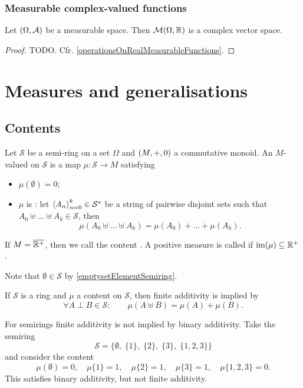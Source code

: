 \subsubsection{Measurable complex-valued functions}
\begin{proposition}
Let $\left( \Omega,\mathcal{A} \right)$ be a measurable space. Then $\operatorname{\mathcal{M}}(\Omega, \mathbb{R})$ is a complex vector space.
\end{proposition}
\begin{proof}
TODO. Cfr. \ref{operationsOnRealMeasurableFunctions}.
\end{proof}


\section{Measures and generalisations}
\subsection{Contents}
\begin{definition}
Let $\mathcal{S}$ be a semi-ring on a set $\Omega$ and $\left( M,+,0 \right)$ a commutative monoid. An $M$-valued  on $\mathcal{S}$ is a map $\mu: \mathcal{S} \to M$ satisfying
\begin{itemize}
\item $\mu(\emptyset) = 0$;
\item $\mu$ is : let $\left\langle A_n \right\rangle_{n=0}^k\in \mathcal{S}^*$ be a string of pairwise disjoint sets such that $A_0 \uplus \ldots \uplus A_{k} \in \mathcal{S}$, then
\[ \mu(A_0 \uplus \ldots \uplus A_{k}) = \mu(A_0) + \ldots + \mu(A_{k}). \]
\end{itemize}
If $M = \overline{\mathbb{R}^+}$, then we call the content . A positive measure is called  if $\operatorname{im}(\mu) \subseteq \mathbb{R}^+$.
\end{definition}
Note that $\emptyset\in \mathcal{S}$ by \ref{emptysetElementSemiring}.

\begin{lemma}
If $\mathcal{S}$ is a ring and $\mu$ a content on $\mathcal{S}$, then finite additivity is implied by
\[ \forall A\perp B\in \mathcal{S}:\qquad \mu(A\uplus B) = \mu(A) + \mu(B). \]
\end{lemma}

\begin{example}
For semirings finite additivity is not implied by binary additivity. Take the semiring
\[ \mathcal{S} = \big\{\emptyset,\; \{1\},\; \{2\},\; \{3\},\; \{1,2,3\}\big\} \]
and consider the content
\[ \mu(\emptyset) = 0,\quad \mu\{1\} = 1, \quad \mu\{2\} = 1, \quad \mu\{3\} = 1, \quad \mu\{1,2,3\} = 0. \]
This satisfies binary additivity, but not finite additivity.
\end{example}

